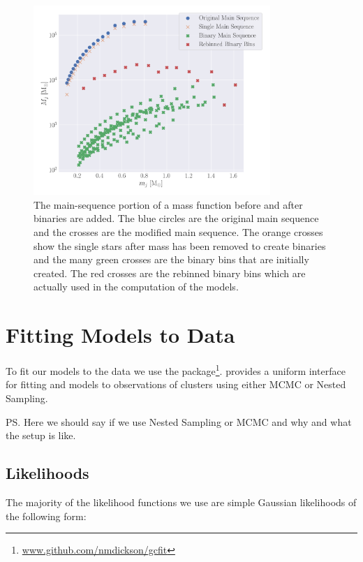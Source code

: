 \begin{figure}
	\centering
	\includegraphics[width=0.8\textwidth]{figures/shifted-mf.png}
	\caption{The main-sequence portion of a mass function before and after binaries are added.
		The blue circles are the original main sequence and the crosses are the modified main
		sequence. The orange crosses show the single stars after mass has been removed to create
		binaries and the many green crosses are the binary bins that are initially created. The red
		crosses are the rebinned binary bins which are actually used in the computation of the
		 models.}
	\label{fig:2/shifted-mf}
\end{figure}



\section{Fitting Models to Data}


To fit our models to the data we use the 
package\footnote{\url{www.github.com/nmdickson/gcfit}}.  provides a uniform interface
for fitting \evolvemf{} and  models to observations of clusters using either MCMC or
Nested Sampling.

\ps{Here we should say if we use Nested Sampling or MCMC and why  and what the setup is like.}

\subsection{Likelihoods}

The majority of the likelihood functions we use are simple Gaussian likelihoods of the following form:

